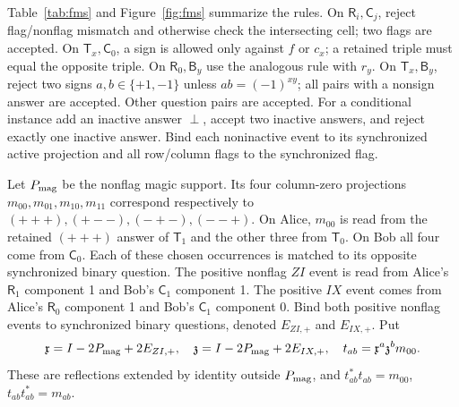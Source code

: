 Table~\ref{tab:fms} and Figure~\ref{fig:fms} summarize the rules. On $\mathsf R_i,\mathsf C_j$, reject flag/nonflag mismatch and otherwise check the intersecting cell; two flags are accepted. On $\mathsf T_x,\mathsf C_0$, a sign is allowed only against $f$ or $c_x$; a retained triple must equal the opposite triple. On $\mathsf R_0,\mathsf B_y$ use the analogous rule with $r_y$. On $\mathsf T_x,\mathsf B_y$, reject two signs $a,b\in\{+1,-1\}$ unless $ab=(-1)^{xy}$; all pairs with a nonsign answer are accepted. Other question pairs are accepted. For a conditional instance add an inactive answer $\perp$, accept two inactive answers, and reject exactly one inactive answer. Bind each noninactive event to its synchronized active projection and all row/column flags to the synchronized flag.

Let $P_{\rm mag}$ be the nonflag magic support. Its four column-zero projections $m_{00},m_{01},m_{10},m_{11}$ correspond respectively to $(+++),(+--),(-+-),(--+)$. On Alice, $m_{00}$ is read from the retained $(+++)$ answer of $\mathsf T_1$ and the other three from $\mathsf T_0$. On Bob all four come from $\mathsf C_0$. Each of these chosen occurrences is matched to its opposite synchronized binary question. The positive nonflag $ZI$ event is read from Alice's $\mathsf R_1$ component 1 and Bob's $\mathsf C_1$ component 1. The positive $IX$ event comes from Alice's $\mathsf R_0$ component 1 and Bob's $\mathsf C_1$ component 0. Bind both positive nonflag events to synchronized binary questions, denoted $E_{ZI,+}$ and $E_{IX,+}$. Put
\[
 \mathfrak x=I-2P_{\rm mag}+2E_{ZI,+},\quad \mathfrak z=I-2P_{\rm mag}+2E_{IX,+},\quad
 t_{ab}=\mathfrak x^a\mathfrak z^bm_{00}.
\]
These are reflections extended by identity outside $P_{\rm mag}$, and $t_{ab}^*t_{ab}=m_{00}$, $t_{ab}t_{ab}^*=m_{ab}$.

